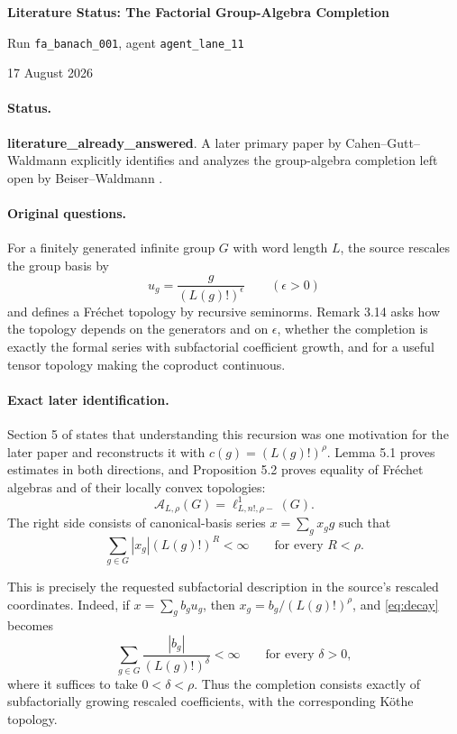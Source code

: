\documentclass[10pt]{article}
\newcommand{\A}{\mathcal A}
\begin{document}
\begin{center}
{\Large\bfseries Literature Status: The Factorial Group-Algebra
Completion\par}
\vspace{0.35em}
{Run \texttt{fa\_banach\_001}, agent \texttt{agent\_lane\_11}\par}
{\small 17 August 2026}
\end{center}
\vspace{0.4em}

\paragraph{Status.}
\textbf{literature\_already\_answered}.  A later primary paper by
Cahen--Gutt--Waldmann \cite{CGW} explicitly identifies and analyzes the
group-algebra completion left open by Beiser--Waldmann \cite{BW}.

\paragraph{Original questions.}
For a finitely generated infinite group $G$ with word length $L$, the source
rescales the group basis by
\[
 u_g=\frac{g}{(L(g)!)^\epsilon}\qquad(\epsilon>0)
\]
and defines a Fr\'echet topology by recursive seminorms.  Remark 3.14 asks
how the topology depends on the generators and on $\epsilon$, whether the
completion is exactly the formal series with subfactorial coefficient
growth, and for a useful tensor topology making the coproduct continuous.

\paragraph{Exact later identification.}
Section 5 of \cite{CGW} states that understanding this recursion was one
motivation for the later paper and reconstructs it with
$c(g)=(L(g)!)^\rho$.  Lemma 5.1 proves estimates in both directions, and
Proposition 5.2 proves equality of Fr\'echet algebras and of their locally
convex topologies:
\[
 \A_{L,\rho}(G)=\ell^1_{L,n!,\rho-}(G).
 \tag{1}\label{eq:id}
\]
The right side consists of canonical-basis series
$x=\sum_gx_g g$ such that
\[
 \sum_{g\in G}|x_g|(L(g)!)^R<\infty
 \qquad\text{for every }R<\rho.
 \tag{2}\label{eq:decay}
\]

This is precisely the requested subfactorial description in the source's
rescaled coordinates.  Indeed, if
$x=\sum_g b_gu_g$, then $x_g=b_g/(L(g)!)^\rho$, and
\eqref{eq:decay} becomes
\[
 \sum_{g\in G}\frac{|b_g|}{(L(g)!)^\delta}<\infty
 \qquad\text{for every }\delta>0,
 \tag{3}\label{eq:subfac}
\]
where it suffices to take $0<\delta<\rho$.  Thus the completion consists
exactly of subfactorially growing rescaled coefficients, with the
corresponding K\"othe topology.
\end{document}
